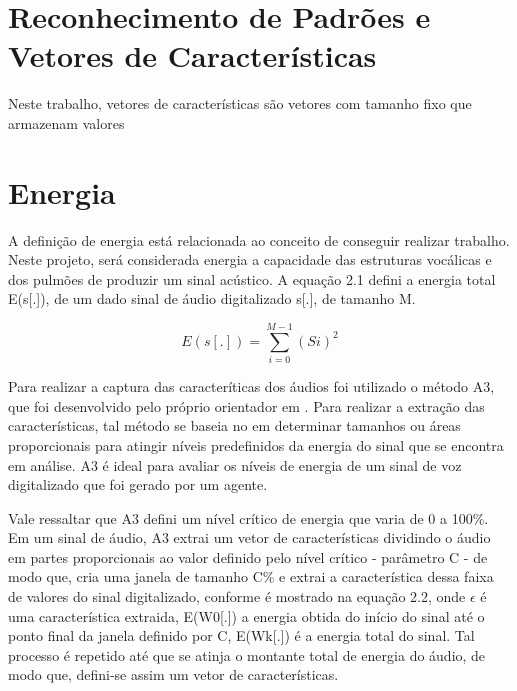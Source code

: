 \documentclass[a4paper,12pt,twoside,openright]{report}
\begin{document}
\section{Reconhecimento de Padr\~{o}es e Vetores de Caracter\'{i}sticas}
\label{vetores de caracterisctica}

\par Neste trabalho, vetores de caracter\'{i}sticas s\~{a}o vetores com tamanho fixo que armazenam valores 
\section{Energia}
\label{energia}
\par A defini{\c c}\~{a}o de energia est\'{a} relacionada ao conceito de conseguir realizar trabalho. Neste projeto, ser\'{a} considerada energia a capacidade das estruturas voc\'{a}licas e dos pulm\~{o}es de produzir um sinal ac\'{u}stico. A equa{\c c}\~{a}o 2.1 defini a energia total E(s[.]), de um dado sinal de \'{a}udio digitalizado s[.], de tamanho M.

\begin{equation}
	E(s[.])=\sum_{i = 0}^{M-1} (Si)^2
\end{equation}

\par Para realizar a captura das caracter\'{i}ticas dos \'{a}udios foi utilizado o m\'{e}todo A3, que foi desenvolvido pelo pr\'{o}prio orientador em \cite{Guido_tutorial}. Para realizar a extra{\c c}\~{a}o das caracter\'{i}sticas, tal m\'{e}todo se baseia no em determinar tamanhos ou \'{a}reas proporcionais para atingir n\'{i}veis predefinidos da energia do sinal que se encontra em an\'{a}lise. A3 \'{e} ideal para avaliar os n\'{i}veis de energia de um sinal de voz digitalizado que foi gerado por um agente.
\par Vale ressaltar que A3 defini um n\'{i}vel cr\'{i}tico de energia que varia de 0 a 100{\%}. Em um sinal de \'{a}udio, A3 extrai um vetor de caracter\'{i}sticas dividindo o \'{a}udio em partes proporcionais ao valor definido pelo n\'{i}vel cr\'{i}tico - par\^{a}metro C - de modo que, cria uma janela de tamanho C{\%} e extrai a caracter\'{i}stica dessa faixa de valores do sinal digitalizado, conforme \'{e} mostrado na equa{\c c}\~{a}o 2.2, onde $\epsilon$ \'{e} uma caracter\'{i}stica extraida, E(W0[.]) a energia obtida do in\'{i}cio do sinal at\'{e} o ponto final da janela definido por C, E(Wk[.]) \'{e} a energia total do sinal. Tal processo \'{e} repetido at\'{e} que se atinja o montante total de energia do \'{a}udio, de modo que, defini-se assim um vetor de caracter\'{i}sticas. 
\end{document}
